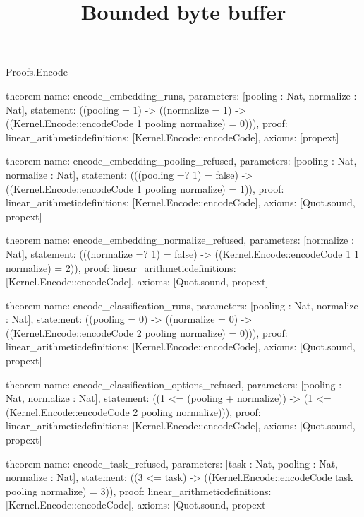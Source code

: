 \begin{lexlean}{Proofs.Encode}
\title{Bounded byte buffer}
\begin{semanticmodule}
theorem{
  name: encode_embedding_runs,
  parameters: [pooling : Nat, normalize : Nat],
  statement: ((pooling = 1) -> ((normalize = 1) -> ((Kernel.Encode::encodeCode 1 pooling normalize) = 0))),
  proof: linear_arithmetic{definitions: [Kernel.Encode::encodeCode]},
  axioms: [propext]
}

theorem{
  name: encode_embedding_pooling_refused,
  parameters: [pooling : Nat, normalize : Nat],
  statement: (((pooling =? 1) = false) -> ((Kernel.Encode::encodeCode 1 pooling normalize) = 1)),
  proof: linear_arithmetic{definitions: [Kernel.Encode::encodeCode]},
  axioms: [Quot.sound, propext]
}

theorem{
  name: encode_embedding_normalize_refused,
  parameters: [normalize : Nat],
  statement: (((normalize =? 1) = false) -> ((Kernel.Encode::encodeCode 1 1 normalize) = 2)),
  proof: linear_arithmetic{definitions: [Kernel.Encode::encodeCode]},
  axioms: [Quot.sound, propext]
}

theorem{
  name: encode_classification_runs,
  parameters: [pooling : Nat, normalize : Nat],
  statement: ((pooling = 0) -> ((normalize = 0) -> ((Kernel.Encode::encodeCode 2 pooling normalize) = 0))),
  proof: linear_arithmetic{definitions: [Kernel.Encode::encodeCode]},
  axioms: [Quot.sound, propext]
}

theorem{
  name: encode_classification_options_refused,
  parameters: [pooling : Nat, normalize : Nat],
  statement: ((1 <= (pooling + normalize)) -> (1 <= (Kernel.Encode::encodeCode 2 pooling normalize))),
  proof: linear_arithmetic{definitions: [Kernel.Encode::encodeCode]},
  axioms: [Quot.sound, propext]
}

theorem{
  name: encode_task_refused,
  parameters: [task : Nat, pooling : Nat, normalize : Nat],
  statement: ((3 <= task) -> ((Kernel.Encode::encodeCode task pooling normalize) = 3)),
  proof: linear_arithmetic{definitions: [Kernel.Encode::encodeCode]},
  axioms: [Quot.sound, propext]
}
\end{semanticmodule}
\end{lexlean}
